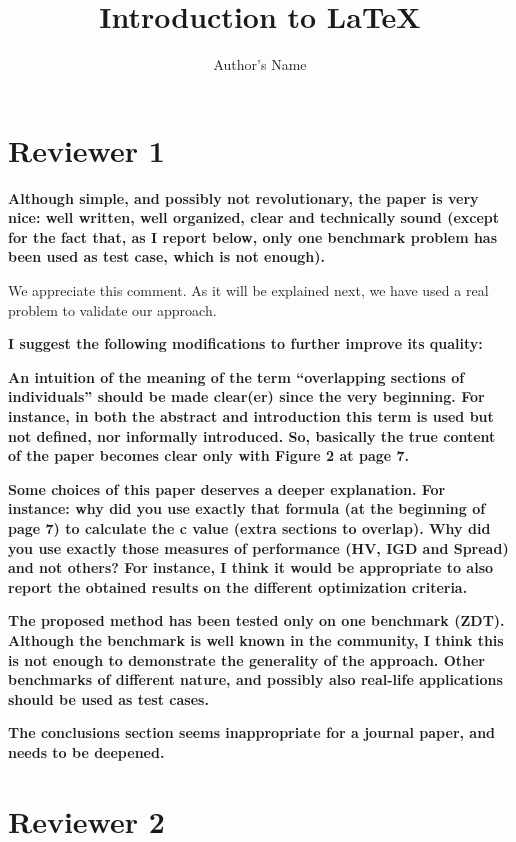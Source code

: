 \documentclass{article}
\begin{document}
\title{Introduction to \LaTeX{}}
\author{Author's Name}

\maketitle

\section{Reviewer 1}



\textbf{Although simple, and possibly not revolutionary, the paper is very nice: well written, well organized, clear and technically sound (except for the fact that, as I report below, only one benchmark problem has been used as test case, which is not enough).}

We appreciate this comment. As it will be explained next, we have used
a real problem to validate our approach. 

\textbf{I suggest the following modifications to further improve its quality:}

\textbf{An intuition of the meaning of the term ``overlapping sections of individuals'' should be made clear(er) since the very beginning. For instance, in both the abstract and introduction this term is used but not defined, nor informally introduced. So, basically the true content of the paper becomes clear only with Figure 2 at page 7.}

\textbf{Some choices of this paper deserves a deeper explanation. For instance: why did you use exactly that formula (at the beginning of page 7) to calculate the c value (extra sections to overlap). Why did you use exactly those measures of performance (HV, IGD and Spread) and not others? For instance, I think it would be appropriate to also report the obtained results on the different optimization criteria.}

\textbf{The proposed method has been tested only on one benchmark (ZDT). Although the benchmark is well known in the community, I think this is not enough to demonstrate the generality of the approach. Other benchmarks of different nature, and possibly also real-life applications should be used as test cases.}

\textbf{The conclusions section seems inappropriate for a journal paper, and needs to be deepened.}

\section{Reviewer 2}
\end{document}
